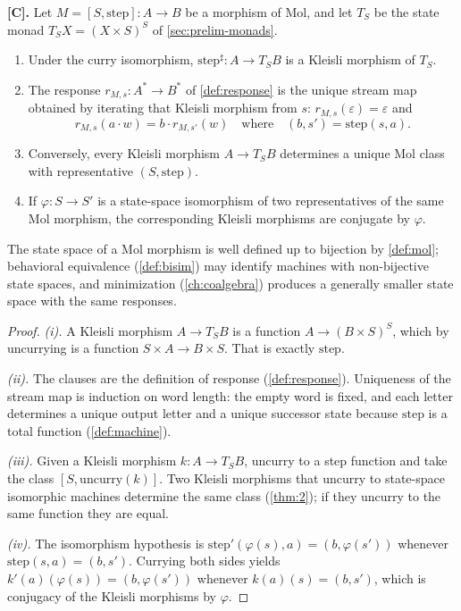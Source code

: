 \begin{theorem}\label{thm:33}
\textbf{[C].} Let $M = [S, \mathrm{step}] : A \to B$ be a morphism of
Mol, and let $T_S$ be the state monad $T_S X = (X \times S)^{S}$ of
\autoref{sec:prelim-monads}.
\begin{enumerate}
\item[(i)] Under the curry isomorphism,
$\mathrm{step}^{\sharp} : A \to T_S B$ is a Kleisli morphism of $T_S$.
\item[(ii)] The response $r_{M,s} : A^{*} \to B^{*}$ of
\autoref{def:response} is the unique stream map obtained by iterating
that Kleisli morphism from $s$: $r_{M,s} (\varepsilon) = \varepsilon$
and
\[
r_{M,s} (a \cdot w) = b \cdot r_{M,s'} (w)
\quad\text{where}\quad (b, s') = \mathrm{step} (s, a).
\]
\item[(iii)] Conversely, every Kleisli morphism $A \to T_S B$ determines
a unique Mol class with representative $(S, \mathrm{step})$.
\item[(iv)] If $\varphi : S \to S'$ is a state-space isomorphism of two
representatives of the same Mol morphism, the corresponding Kleisli
morphisms are conjugate by $\varphi$.
\end{enumerate}
The state space of a Mol morphism is well defined up to bijection by
\autoref{def:mol}; behavioral equivalence (\autoref{def:bisim}) may
identify machines with non-bijective state spaces, and minimization
(\autoref{ch:coalgebra}) produces a generally smaller state space with
the same responses.
\end{theorem}

\begin{proof}
\emph{(i).} A Kleisli morphism $A \to T_S B$ is a function
$A \to (B \times S)^{S}$, which by uncurrying is a function
$S \times A \to B \times S$. That is exactly $\mathrm{step}$.

\emph{(ii).} The clauses are the definition of response
(\autoref{def:response}). Uniqueness of the stream map is induction on
word length: the empty word is fixed, and each letter determines a
unique output letter and a unique successor state because
$\mathrm{step}$ is a total function (\autoref{def:machine}).

\emph{(iii).} Given a Kleisli morphism $k : A \to T_S B$, uncurry to a
step function and take the class $[S, \mathrm{uncurry} (k)]$. Two Kleisli
morphisms that uncurry to state-space isomorphic machines determine the
same class (\autoref{thm:2}); if they uncurry to the same function they
are equal.

\emph{(iv).} The isomorphism hypothesis is
$\mathrm{step}' (\varphi (s), a) = (b, \varphi (s'))$ whenever
$\mathrm{step} (s, a) = (b, s')$. Currying both sides yields
$k' (a) (\varphi (s)) = (b, \varphi (s'))$ whenever $k (a) (s) = (b, s')$,
which is conjugacy of the Kleisli morphisms by $\varphi$.
\end{proof}

